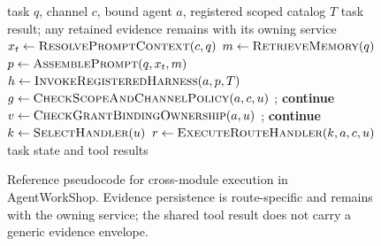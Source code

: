 \begin{figure}[!t]
\centering
\begin{algorithmic}[1]
\Require task $q$, channel $c$, bound agent $a$, registered scoped catalog $T$
\Ensure task result; any retained evidence remains with its owning service
\State $x_t \gets \Call{ResolvePromptContext}{c,q}$
\State $m \gets \Call{RetrieveMemory}{q}$
\State $p \gets \Call{AssemblePrompt}{q,x_t,m}$
\State $h \gets \Call{InvokeRegisteredHarness}{a,p,T}$
  \State $g \gets \Call{CheckScopeAndChannelPolicy}{a,c,u}$
    \State {}; \textbf{continue}
  \EndIf
    \State $v \gets \Call{CheckGrantBindingOwnership}{a,u}$
      \State {}; \textbf{continue}
    \EndIf
  \EndIf
  \State $k \gets \Call{SelectHandler}{u}$
  \State $r \gets \Call{ExecuteRouteHandler}{k,a,c,u}$
  \State {}
\EndFor
\State \Return task state and tool results
\end{algorithmic}
\caption{Reference pseudocode for cross-module execution in AgentWorkShop.
Evidence persistence is route-specific and remains with the owning service;
the shared tool result does not carry a generic evidence envelope.}
\label{fig:execution}
\end{figure}

